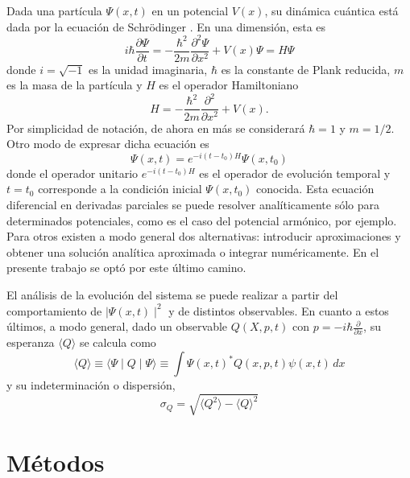 \documentclass[aps,prb,twocolumn,superscriptaddress,floatfix,longbibliography]{revtex4-2}
\newif\ifptitle
\newif\ifpnumber
\newcounter{para}
\newcommand\ptitle[1]{\par\refstepcounter{para}
{\ifpnumber{\noindent\textcolor{lightgray}{\textbf{\thepara}}\indent}\fi}
{\ifptitle{\textbf{[{#1}]}}\fi}}
\begin{document}
\ptitle{Presentar Ec. De Sch}

Dada una partícula $\Psi(x,t)$ en un potencial $V(x)$, su dinámica cuántica está dada por la ecuación de Schrödinger \cite{Griffiths}. En una dimensión, esta es
\[i \hbar \frac{\partial \Psi}{\partial t} = - \frac{\hbar^2}{2m} \frac{\partial^2 \Psi}{\partial x^2} + V(x) \Psi = H \Psi \]
donde $i = \sqrt{-1}$ es la unidad imaginaria, $\hbar$ es la constante de Plank reducida, $m$ es la masa de la partícula y $H$ es el operador Hamiltoniano
\begin{equation}
H = - \frac{\hbar^2}{2m} \frac{\partial^2 }{\partial x^2} + V(x).
\label{eq:Hamilton}
\end{equation}
Por simplicidad de notación, de ahora en más se considerará $\hbar = 1$ y $m = 1/2$.
Otro modo de expresar dicha ecuación es
\begin{equation}
\Psi(x,t) = e^{-i(t-t_0)H} \Psi(x,t_0)
\label{eq:sol_formal}
\end{equation}
donde el operador unitario $e^{-i(t-t_0)H}$ es el operador de evolución temporal y $t = t_0$ corresponde a la condición inicial $\Psi(x,t_0)$ conocida. Esta ecuación diferencial en derivadas parciales se puede resolver analíticamente sólo para determinados potenciales, como es el caso del potencial armónico, por ejemplo. Para otros existen a modo general dos alternativas: introducir aproximaciones y obtener una solución analítica aproximada o integrar numéricamente. En el presente trabajo se optó por este último camino.

El análisis de la evolución del sistema se puede realizar a partir del comportamiento de $\mid \Psi(x,t) \mid^2$ y de distintos observables. En cuanto a estos últimos, a modo general, dado un observable $Q(X, p, t)$ con $p = -i\hbar\frac{\partial}{\partial x}$, su esperanza $\langle Q \rangle$ se calcula como \cite{Griffiths}
\[\langle Q \rangle \equiv \langle \Psi \mid Q \mid \Psi \rangle \equiv \int{\Psi(x,t)^* Q(x, p, t) \psi(x,t)} \, dx \]
y su indeterminación o dispersión,
\begin{equation}
\sigma_Q = \sqrt{\langle Q^2 \rangle - \langle Q \rangle^2}
\label{eq:dispersion}
\end{equation}

\section{Métodos}

\ptitle{Representación de Carley y deducción de la expresión implícita}
\end{document}
